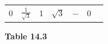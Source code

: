 {{\begin{center}
\begin{xtabular}[t]{|l|l|l|l|l|l|l|}
    
        0 &
    
    
        
                \begin{math}\frac{1}{\sqrt{3}}\end{math}
               &
    
    
        1 &
    
    
        
                \begin{math}\sqrt{3}\end{math}
               &
    
    
        
                \begin{math}-\end{math}
               &
    
    
        0%
     \tabularnewline{}
    \end{xtabular}
      \end{center}
    \begin{center}{\small\bfseries Table 14.3}\end{center}
    
}}
